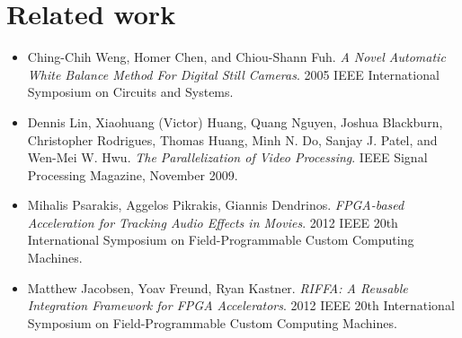 \documentclass{acm_proc_article-sp}
\begin{document}
\section{Related work}
\begin{itemize}
\item Ching-Chih Weng, Homer Chen, and Chiou-Shann Fuh. \textit{A Novel Automatic White Balance Method For Digital Still Cameras}. 2005 IEEE International Symposium on Circuits and Systems.
\item Dennis Lin, Xiaohuang (Victor) Huang, Quang Nguyen, Joshua Blackburn, Christopher Rodrigues, Thomas Huang, Minh N. Do, Sanjay J. Patel, and Wen-Mei W. Hwu. \textit{The Parallelization of Video Processing}. IEEE Signal Processing Magazine, November 2009.
\item Mihalis Psarakis, Aggelos Pikrakis, Giannis Dendrinos. \textit{FPGA-based Acceleration for Tracking Audio Effects in Movies}. 2012 IEEE 20th International Symposium on Field-Programmable Custom Computing Machines.
\item Matthew Jacobsen, Yoav Freund, Ryan Kastner. \textit{RIFFA: A Reusable Integration Framework for FPGA Accelerators}. 2012 IEEE 20th International Symposium on Field-Programmable Custom Computing Machines.
\end{itemize}
\end{document}
